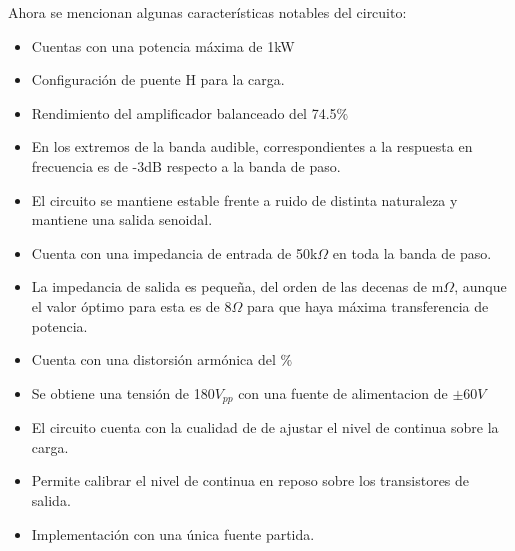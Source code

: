 Ahora se mencionan algunas características notables del circuito:
\begin{itemize}
\item Cuentas con una potencia máxima de 1kW
\item Configuración de puente H  para la carga.
\item Rendimiento del amplificador balanceado del 74.5$\%$
\item En los extremos de la banda audible, correspondientes a la respuesta en frecuencia es de -3dB respecto a la banda de paso.

\item El circuito se mantiene estable frente a ruido de distinta naturaleza y mantiene una salida senoidal.

\item Cuenta con una impedancia de entrada de 50k$\Omega$ en toda la banda de paso.
\item La impedancia de salida es pequeña, del orden de las decenas de m$\Omega$, aunque el valor óptimo para esta es de 8$\Omega$ para que haya máxima transferencia de potencia.


\item Cuenta con una distorsión armónica del $\%$
\item Se obtiene una tensión de 180$V_{pp}$ con una fuente de  alimentacion de $\pm 60V$
\item El circuito cuenta con la cualidad de de ajustar el nivel de continua sobre la carga.
\item Permite calibrar el nivel de continua en reposo sobre los transistores de salida.
\item Implementación con una única fuente partida.



\end{itemize}

